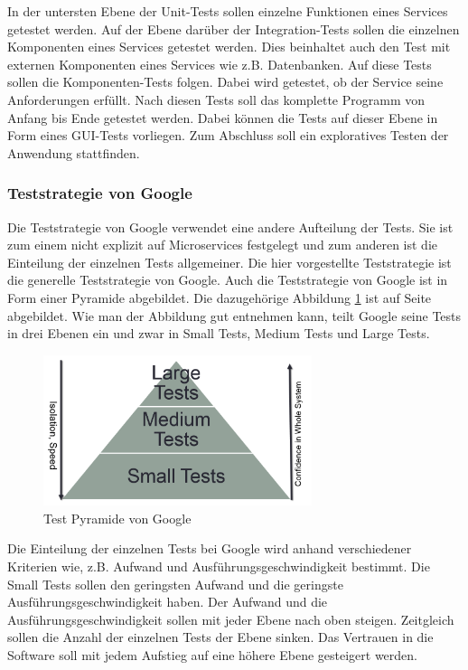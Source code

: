 \documentclass{llncs}
\begin{document}
In der untersten Ebene der Unit-Tests sollen einzelne Funktionen eines Services getestet werden. Auf der Ebene darüber der Integration-Tests sollen die einzelnen Komponenten eines Services getestet werden. Dies beinhaltet auch den Test mit externen Komponenten eines Services wie z.B. Datenbanken. Auf diese Tests sollen die Komponenten-Tests folgen. Dabei wird getestet, ob der Service seine Anforderungen erfüllt. Nach diesen Tests soll das komplette Programm von Anfang bis Ende getestet werden. Dabei können die Tests auf dieser Ebene in Form eines GUI-Tests vorliegen. Zum Abschluss soll ein exploratives Testen der Anwendung stattfinden.

\subsubsection{Teststrategie von Google}
Die Teststrategie von Google verwendet eine andere Aufteilung der Tests. Sie ist zum einem nicht explizit auf Microservices festgelegt und zum anderen ist die Einteilung der einzelnen Tests allgemeiner. Die hier vorgestellte Teststrategie ist die generelle Teststrategie von Google. Auch die Teststrategie von Google ist in Form einer Pyramide abgebildet. Die dazugehörige Abbildung \ref{fig:PyramideGoogle} ist auf Seite \pageref{fig:PyramideGoogle} abgebildet. Wie man der Abbildung gut entnehmen kann, teilt Google seine Tests in drei Ebenen ein und zwar in Small Tests, Medium Tests und Large Tests.

\begin{figure}[htbp]
  \centering
      \includegraphics[width=0.7\textwidth]{./Images/GooglePyramide.PNG}
    \caption{Test Pyramide von Google}
    \label{fig:PyramideGoogle}
\end{figure}

Die Einteilung der einzelnen Tests bei Google wird anhand verschiedener Kriterien wie, z.B. Aufwand und Ausführungsgeschwindigkeit bestimmt. Die Small Tests sollen den geringsten Aufwand und die geringste Ausführungsgeschwindigkeit haben. Der Aufwand und die Ausführungsgeschwindigkeit sollen mit jeder Ebene nach oben steigen. Zeitgleich sollen die Anzahl der einzelnen Tests der Ebene sinken. Das Vertrauen in die Software soll mit jedem Aufstieg auf eine höhere Ebene gesteigert werden.
\end{document}
